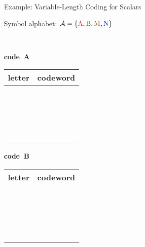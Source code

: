 

\begin{frame}{Example: Variable-Length Coding for Scalars}
  \vspace{-1.5ex}
  \bit\TabPositions{9.2em,22.5em}
\item Symbol alphabet:
  $\set{A}=\{{\color{red}{\text{A}}},
  {\color{officegreen}{\text{B}}},
  {\color{saddlebrown}{\text{M}}},{\color{blue}{\text{N}}}\}$
\item[]~\\[-1ex]
  {
  \begin{minipage}{0.32\linewidth}
    \begin{center}
      {\bf code~A}\\[.5ex]
      \begin{tabular}{|c|l|}
        \hline
    \color{black}letter & \color{black}codeword\\
    \hline\rule{0ex}{2.5ex}%
    \color{red}{A}         & ~~~\color{red}{00}\\
    \color{officegreen}{B} & ~~~\color{officegreen}{01}\\
    \color{saddlebrown}{M} & ~~~\color{saddlebrown}{10}\\
    \color{blue}{N}        & ~~~\color{blue}{11}\\
        \hline
    \end{tabular}
    \end{center}
  \end{minipage}
  \begin{minipage}{0.32\linewidth}
    {\begin{center}
      {\bf code~B}\\[.5ex]
      \begin{tabular}{|c|l|}
        \hline
    \color{black}letter & \color{black}codeword\\
    \hline\rule{0ex}{2.5ex}%
    \color{red}{A}         & ~~~\color{red}{010}\\
    \color{officegreen}{B} & ~~~\color{officegreen}{100}\\
    \color{saddlebrown}{M} & ~~~\color{saddlebrown}{10}\\
    \color{blue}{N}        & ~~~\color{blue}{0}\\
        \hline
    \end{tabular}
    \end{center}}
    \end{minipage}
  \begin{minipage}{0.32\linewidth}
    {\begin{center}

\end{center}}
\end{minipage}}
\end{frame}
